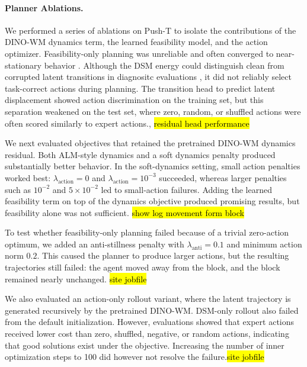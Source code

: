 {\paragraph{Planner Ablations.}
We performed a series of ablations on Push-T to isolate the contributions of the DINO-WM dynamics term, the learned feasibility model, and the action optimizer. Feasibility-only planning was unreliable and often converged to near-stationary behavior \cite{values from initial jobsripts stilness}. Although the DSM energy could distinguish clean from corrupted latent transitions in diagnositc evaluations \cite{evaluate.py scores}, it did not reliably select task-correct actions during planning. The transition head to predict latent displacement showed action discrimination on the training set, but this separation weakened on the test set, where zero, random, or shuffled actions were often scored similarly to expert actions.\cite{evaluate.py scores},
\hl{residual head performance}

We next evaluated objectives that retained the pretrained DINO-WM dynamics residual. Both ALM-style dynamics and a soft dynamics penalty produced substantially better behavior. In the soft-dynamics setting, small action penalties worked best: $\lambda_{\mathrm{action}}=0$ and $\lambda_{\mathrm{action}}=10^{-3}$ succeeded, whereas larger penalties such as $10^{-2}$ and $5\times10^{-2}$ led to small-action failures. Adding the learned feasibility term on top of the dynamics objective produced promising results, but feasibility alone was not sufficient.  \hl{show log movement form block}

To test whether feasibility-only planning failed because of a trivial zero-action optimum, we added an anti-stillness penalty with $\lambda_{\mathrm{anti}}=0.1$ and minimum action norm $0.2$. This caused the planner to produce larger actions, but the resulting trajectories still failed: the agent moved away from the block, and the block remained nearly unchanged.
\hl{site jobfile}

We also evaluated an action-only rollout variant, where the latent trajectory is generated recursively by the pretrained DINO-WM.
DSM-only rollout also failed from the default initialization. However, evaluations \cite{evaluate.py scores} showed that expert actions received lower cost than zero, shuffled, negative, or random actions, indicating that good solutions exist under the objective. Increasing the number of inner optimization steps to 100 did however not resolve the failure.\hl{site jobfile}

}
